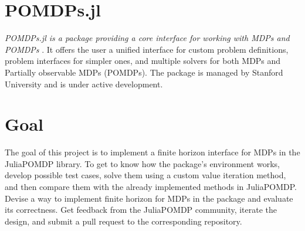 \section{POMDPs.jl}
\textit{POMDPs.jl is a package providing a core interface for working with MDPs and POMDPs} \cite{JMLR:v18:16-300}. It offers the user a unified interface for custom problem definitions, problem interfaces for simpler ones, and multiple solvers for both MDPs and Partially observable MDPs (POMDPs). The package is managed by Stanford University and is under active development.


\section{Goal}
The goal of this project is to implement a finite horizon interface for MDPs in the JuliaPOMDP library. To get to know how the package's environment works, develop possible test cases, solve them using a custom value iteration method, and then compare them with the already implemented methods in JuliaPOMDP. Devise a way to implement finite horizon for MDPs in the package and evaluate its correctness. Get feedback from the JuliaPOMDP community, iterate the design, and submit a pull request to the corresponding repository.

